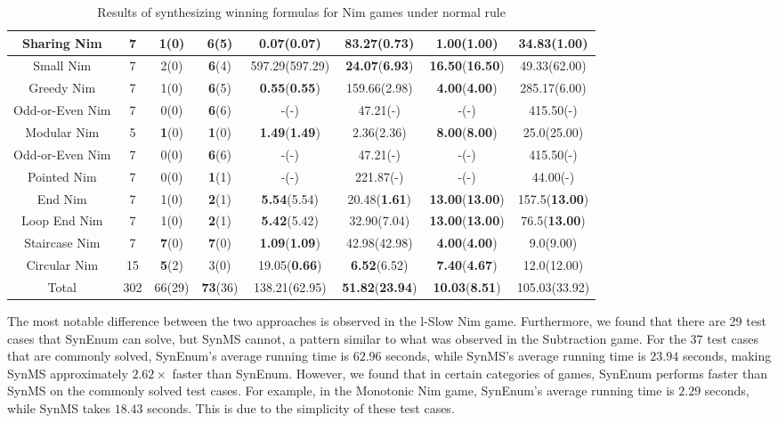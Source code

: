 \documentclass[review]{elsarticle}
\begin{document}
\begin{table}[h]
\begin{tabular}{|c|c|c|c|c|c|c|c|}
        Sharing Nim & 7 & 1(0) & \textbf{6}(5) & \textbf{0.07}(\textbf{0.07}) & 83.27(0.73) & \textbf{1.00}(\textbf{1.00}) & 34.83(\textbf{1.00}) \\ \hline
        Small Nim & 7 & 2(0) & \textbf{6}(4) & 597.29(597.29) & \textbf{24.07}(\textbf{6.93}) & \textbf{16.50}(\textbf{16.50}) & 49.33(62.00) \\ \hline
        Greedy Nim & 7 & 1(0) & \textbf{6}(5) & \textbf{0.55}(\textbf{0.55}) & 159.66(2.98) & \textbf{4.00}(\textbf{4.00}) & 285.17(6.00) \\ \hline
        Odd-or-Even Nim & 7 & 0(0) & \textbf{6}(6) & -(-) & 47.21(-) & -(-) & 415.50(-) \\ \hline
        Modular Nim & 5 & \textbf{1}(0) & \textbf{1}(0) & \textbf{1.49}(\textbf{1.49}) & 2.36(2.36) & \textbf{8.00}(\textbf{8.00}) & 25.0(25.00) \\\hline
        Odd-or-Even Nim & 7 & 0(0) & \textbf{6}(6) & -(-) & 47.21(-) & -(-) & 415.50(-) \\ \hline
        Pointed Nim & 7 & 0(0) & \textbf{1}(1) & -(-) & 221.87(-) & -(-) & 44.00(-) \\ \hline
        End Nim & 7 & 1(0) & \textbf{2}(1) & \textbf{5.54}(5.54) & 20.48(\textbf{1.61}) & \textbf{13.00}(\textbf{13.00}) & 157.5(\textbf{13.00}) \\  \hline
        Loop End Nim & 7 & 1(0) & \textbf{2}(1) & \textbf{5.42}(5.42) & 32.90(7.04) & \textbf{13.00}(\textbf{13.00}) & 76.5(\textbf{13.00}) \\ \hline
        Staircase Nim & 7 & \textbf{7}(0) & \textbf{7}(0) & \textbf{1.09}(\textbf{1.09}) & 42.98(42.98) & \textbf{4.00}(\textbf{4.00}) & 9.0(9.00) \\ \hline
        Circular Nim & 15 & \textbf{5}(2) & 3(0) & 19.05(\textbf{0.66}) & \textbf{6.52}(6.52) & \textbf{7.40}(\textbf{4.67}) & 12.0(12.00) \\ \hline
        Total & 302 & 66(29) & \textbf{73}(36) & 138.21(62.95) & \textbf{51.82}(\textbf{23.94}) & \textbf{10.03}(\textbf{8.51}) & 105.03(33.92) \\ \hline
	\end{tabular}
	\caption{Results of synthesizing winning formulas for Nim games under normal rule}
	\label{tab:normal-nim-winFormulas}
\end{table}
The most notable difference between the two approaches is observed in the l-Slow Nim game. Furthermore, we found that there are 29 test cases that SynEnum can solve, but SynMS cannot, a pattern similar to what was observed in the Subtraction game. For the $37$ test cases that are commonly solved, SynEnum's average running time is $62.96$ seconds, while SynMS's average running time is $23.94$ seconds, making SynMS approximately $2.62\times$ faster than SynEnum. However, we found that in certain categories of games, SynEnum performs faster than SynMS on the commonly solved test cases. For example, in the Monotonic Nim game, SynEnum's average running time is $2.29$ seconds, while SynMS takes $18.43$ seconds. This is due to the simplicity of these test cases.
\end{document}
